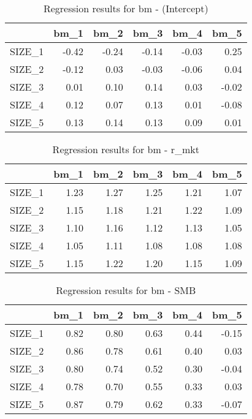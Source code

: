 \begin{table}[ht]
\centering
\caption{Regression results for bm - (Intercept)} 
\begin{tabular}{rrrrrr}
  \hline
 & bm\_1 & bm\_2 & bm\_3 & bm\_4 & bm\_5 \\ 
  \hline
SIZE\_1 & -0.42 & -0.24 & -0.14 & -0.03 & 0.25 \\ 
  SIZE\_2 & -0.12 & 0.03 & -0.03 & -0.06 & 0.04 \\ 
  SIZE\_3 & 0.01 & 0.10 & 0.14 & 0.03 & -0.02 \\ 
  SIZE\_4 & 0.12 & 0.07 & 0.13 & 0.01 & -0.08 \\ 
  SIZE\_5 & 0.13 & 0.14 & 0.13 & 0.09 & 0.01 \\ 
   \hline
\end{tabular}
\end{table}


\begin{table}[ht]
\centering
\caption{Regression results for bm - r_mkt} 
\begin{tabular}{rrrrrr}
  \hline
 & bm\_1 & bm\_2 & bm\_3 & bm\_4 & bm\_5 \\ 
  \hline
SIZE\_1 & 1.23 & 1.27 & 1.25 & 1.21 & 1.07 \\ 
  SIZE\_2 & 1.15 & 1.18 & 1.21 & 1.22 & 1.09 \\ 
  SIZE\_3 & 1.10 & 1.16 & 1.12 & 1.13 & 1.05 \\ 
  SIZE\_4 & 1.05 & 1.11 & 1.08 & 1.08 & 1.08 \\ 
  SIZE\_5 & 1.15 & 1.22 & 1.20 & 1.15 & 1.09 \\ 
   \hline
\end{tabular}
\end{table}


\begin{table}[ht]
\centering
\caption{Regression results for bm - SMB} 
\begin{tabular}{rrrrrr}
  \hline
 & bm\_1 & bm\_2 & bm\_3 & bm\_4 & bm\_5 \\ 
  \hline
SIZE\_1 & 0.82 & 0.80 & 0.63 & 0.44 & -0.15 \\ 
  SIZE\_2 & 0.86 & 0.78 & 0.61 & 0.40 & 0.03 \\ 
  SIZE\_3 & 0.80 & 0.74 & 0.52 & 0.30 & -0.04 \\ 
  SIZE\_4 & 0.78 & 0.70 & 0.55 & 0.33 & 0.03 \\ 
  SIZE\_5 & 0.87 & 0.79 & 0.62 & 0.33 & -0.07 \\ 
   \hline
\end{tabular}
\end{table}


